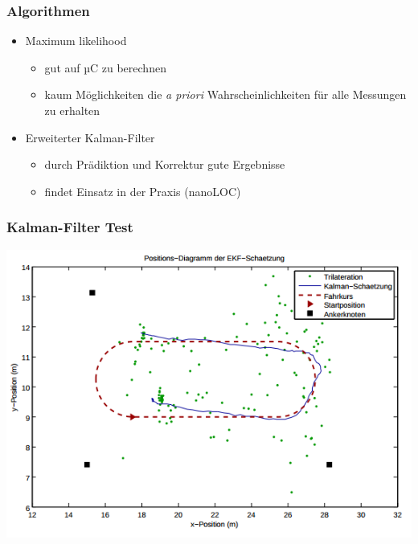 \begin{frame}
  \frametitle{Algorithmen}

  \begin{itemize}
  \item Maximum likelihood
    \begin{itemize}
    \item gut auf µC zu berechnen
    \item kaum Möglichkeiten die \textit{a priori}
      Wahrscheinlichkeiten für alle Messungen zu erhalten
    \end{itemize}
  \item Erweiterter Kalman-Filter
    \begin{itemize}
    \item durch Prädiktion und Korrektur gute Ergebnisse
    \item findet Einsatz in der Praxis (nanoLOC)
    \end{itemize}
  \end{itemize}
\end{frame}

\begin{frame}
  \frametitle{Kalman-Filter Test}

  \begin{center}
    \includegraphics[scale=0.5]{img/kalman}
  \end{center}
\end{frame}

